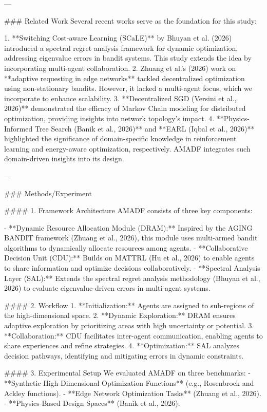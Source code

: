 ---

### Related Work  
Several recent works serve as the foundation for this study:  

1. **Switching Cost-aware Learning (SCaLE)** by Bhuyan et al. (2026) introduced a spectral regret analysis framework for dynamic optimization, addressing eigenvalue errors in bandit systems. This study extends the idea by incorporating multi-agent collaboration.  
2. Zhuang et al.'s (2026) work on **adaptive requesting in edge networks** tackled decentralized optimization using non-stationary bandits. However, it lacked a multi-agent focus, which we incorporate to enhance scalability.  
3. **Decentralized SGD (Versini et al., 2026)** demonstrated the efficacy of Markov Chain modeling for distributed optimization, providing insights into network topology's impact.  
4. **Physics-Informed Tree Search (Banik et al., 2026)** and **EARL (Iqbal et al., 2026)** highlighted the significance of domain-specific knowledge in reinforcement learning and energy-aware optimization, respectively. AMADF integrates such domain-driven insights into its design.  

---

### Methods/Experiment  

#### 1. Framework Architecture  
AMADF consists of three key components:  

- **Dynamic Resource Allocation Module (DRAM):** Inspired by the AGING BANDIT framework (Zhuang et al., 2026), this module uses multi-armed bandit algorithms to dynamically allocate resources among agents.  
- **Collaborative Decision Unit (CDU):** Builds on MATTRL (Hu et al., 2026) to enable agents to share information and optimize decisions collaboratively.  
- **Spectral Analysis Layer (SAL):** Extends the spectral regret analysis methodology (Bhuyan et al., 2026) to evaluate eigenvalue-driven errors in multi-agent systems.  

#### 2. Workflow  
1. **Initialization:** Agents are assigned to sub-regions of the high-dimensional space.  
2. **Dynamic Exploration:** DRAM ensures adaptive exploration by prioritizing areas with high uncertainty or potential.  
3. **Collaboration:** CDU facilitates inter-agent communication, enabling agents to share experiences and refine strategies.  
4. **Optimization:** SAL analyzes decision pathways, identifying and mitigating errors in dynamic constraints.  

#### 3. Experimental Setup  
We evaluated AMADF on three benchmarks:  
- **Synthetic High-Dimensional Optimization Functions** (e.g., Rosenbrock and Ackley functions).  
- **Edge Network Optimization Tasks** (Zhuang et al., 2026).  
- **Physics-Based Design Spaces** (Banik et al., 2026).  

